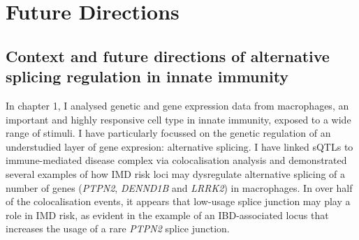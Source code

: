 \chapter{Future Directions}

\ifpdf
    \graphicspath{{Chapter5/Figs/Raster/}{Chapter5/Figs/PDF/}{Chapter5/Figs/}}
\else
    \graphicspath{{Chapter5/Figs/Vector/}{Chapter5/Figs/}}
\fi

\section{Context and future directions of alternative splicing regulation in innate immunity}
In chapter 1, I analysed genetic and gene expression data from macrophages, an important and highly responsive cell type in innate immunity, exposed to a wide range of stimuli. I have particularly focussed on the genetic regulation of an understudied layer of gene expresion: alternative splicing. I have linked sQTLs to immune-mediated disease complex via colocalisation analysis and demonstrated several examples of how IMD risk loci may dysregulate alternative splicing of a number of genes (\textit{PTPN2}, \textit{DENND1B} and \textit{LRRK2}) in macrophages. In over half of the colocalisation events, it appears that low-usage splice junction may play a role in IMD risk, as evident in the example of an IBD-associated locus that increases the usage of a rare \textit{PTPN2} splice junction. \\

